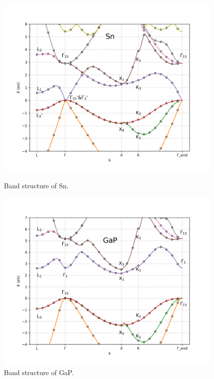 \documentclass[twocolumn]{article}[h]
\begin{document}
\begin{figure}[htb]
    \includegraphics[width=\linewidth]{Sn.png}
    \vspace{-1cm}
    \caption{Band structure of Sn.}
    \label{fig:Sn}

    \includegraphics[width=\linewidth]{Gap.png}
    \vspace{-1cm}
    \caption{Band structure of GaP.}
    \label{fig:GaP}


\end{figure}
\end{document}
